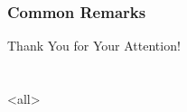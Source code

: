\section{Common Remarks}

\begin{frame}[fragile]{\secname}
\end{frame}

\begin{frame}[plain]
\vfill
\centerline{Thank You for Your Attention!}
\vfill\vfill
\end{frame}

\part{\bibname}
\frame{\vfill\partpage\vfill}

\section{\bibname}
\begin{frame}[allowframebreaks]{\bibname}
\printbibliography[heading=none]
\end{frame}

\mode
<all>
